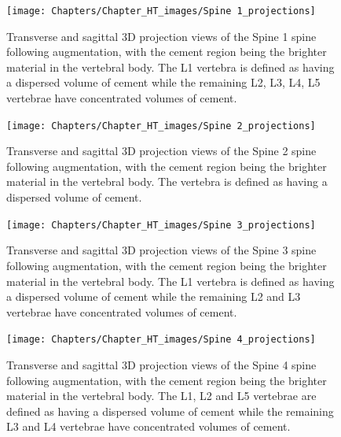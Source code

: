 \begin{figure}[h!]
  \centering
  \texttt{[image: Chapters/Chapter\_HT\_images/Spine 1\_projections]}
	\caption{Transverse and sagittal 3D projection views of the Spine 1 spine following augmentation, with the cement region being the brighter material in the vertebral body. The L1 vertebra is defined as having a dispersed volume of cement while the remaining L2, L3, L4, L5 vertebrae have concentrated volumes of cement.}
  \label{fig:Spine 1_projection}
\end{figure}

\begin{figure}[h!]
  \centering
  \texttt{[image: Chapters/Chapter\_HT\_images/Spine 2\_projections]}
	\caption{Transverse and sagittal 3D projection views of the Spine 2 spine following augmentation, with the cement region being the brighter material in the vertebral body. The vertebra is defined as having a dispersed volume of cement.}
  \label{fig:Spine 2_projection}
\end{figure}

\begin{figure}[h!]
  \centering
  \texttt{[image: Chapters/Chapter\_HT\_images/Spine 3\_projections]}
	\caption{Transverse and sagittal 3D projection views of the Spine 3 spine following augmentation, with the cement region being the brighter material in the vertebral body. The L1 vertebra is defined as having a dispersed volume of cement while the remaining L2 and L3 vertebrae have concentrated volumes of cement.}
  \label{fig:Spine 3_projection}
\end{figure}

\begin{figure}[h!]
  \centering
  \texttt{[image: Chapters/Chapter\_HT\_images/Spine 4\_projections]}
	\caption{Transverse and sagittal 3D projection views of the Spine 4 spine following augmentation, with the cement region being the brighter material in the vertebral body. The L1, L2 and L5 vertebrae are defined as having a dispersed volume of cement while the remaining L3 and L4 vertebrae have concentrated volumes of cement.}
  \label{fig:Spine 4_projection}
\end{figure}


